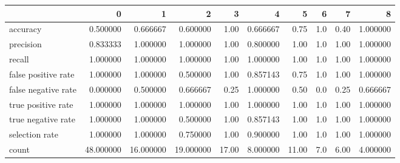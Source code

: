 \begin{tabular}{lrrrrrrrrr}
\toprule
{} &          0 &          1 &          2 &      3 &         4 &      5 &    6 &     7 &         8 \\
\midrule
accuracy            &   0.500000 &   0.666667 &   0.600000 &   1.00 &  0.666667 &   0.75 &  1.0 &  0.40 &  1.000000 \\
precision           &   0.833333 &   1.000000 &   1.000000 &   1.00 &  0.800000 &   1.00 &  1.0 &  1.00 &  1.000000 \\
recall              &   1.000000 &   1.000000 &   1.000000 &   1.00 &  1.000000 &   1.00 &  1.0 &  1.00 &  1.000000 \\
false positive rate &   1.000000 &   1.000000 &   0.500000 &   1.00 &  0.857143 &   0.75 &  1.0 &  1.00 &  1.000000 \\
false negative rate &   0.000000 &   0.500000 &   0.666667 &   0.25 &  1.000000 &   0.50 &  0.0 &  0.25 &  0.666667 \\
true positive rate  &   1.000000 &   1.000000 &   1.000000 &   1.00 &  1.000000 &   1.00 &  1.0 &  1.00 &  1.000000 \\
true negative rate  &   1.000000 &   1.000000 &   0.500000 &   1.00 &  0.857143 &   1.00 &  1.0 &  1.00 &  1.000000 \\
selection rate      &   1.000000 &   1.000000 &   0.750000 &   1.00 &  0.900000 &   1.00 &  1.0 &  1.00 &  1.000000 \\
count               &  48.000000 &  16.000000 &  19.000000 &  17.00 &  8.000000 &  11.00 &  7.0 &  6.00 &  4.000000 \\
\bottomrule
\end{tabular}
